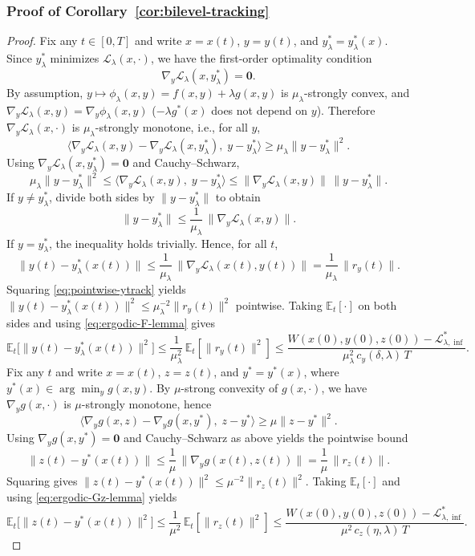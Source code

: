 \documentclass{article}
\newcommand{\1}{\mathbf{1}}
\begin{document}
\subsubsection{Proof of Corollary~\ref{cor:bilevel-tracking}}

\begin{proof}
Fix any $t\in[0,T]$ and write $x=x(t)$, $y=y(t)$, and $y_\lambda^*=y_\lambda^*(x)$.
Since $y_\lambda^*$ minimizes $\mathcal L_\lambda(x,\cdot)$, we have the first-order optimality condition
\[
\nabla_y \mathcal L_\lambda(x,y_\lambda^*)=\mathbf 0.
\]
By assumption, $y\mapsto \phi_\lambda(x,y)=f(x,y)+\lambda g(x,y)$ is $\mu_\lambda$-strongly convex, and
$\nabla_y\mathcal L_\lambda(x,y)=\nabla_y\phi_\lambda(x,y)$ ($-\lambda g^*(x)$ does not depend on $y$).
Therefore $\nabla_y\mathcal L_\lambda(x,\cdot)$ is $\mu_\lambda$-strongly monotone, i.e.,
for all $y$,
\[
\big\langle \nabla_y\mathcal L_\lambda(x,y)-\nabla_y\mathcal L_\lambda(x,y_\lambda^*),\; y-y_\lambda^*\big\rangle
\ge
\mu_\lambda \|y-y_\lambda^*\|^2.
\]
Using $\nabla_y\mathcal L_\lambda(x,y_\lambda^*)=\mathbf 0$ and Cauchy--Schwarz,
\[
\mu_\lambda \|y-y_\lambda^*\|^2
\le
\big\langle \nabla_y\mathcal L_\lambda(x,y),\; y-y_\lambda^*\big\rangle
\le
\|\nabla_y\mathcal L_\lambda(x,y)\|\,\|y-y_\lambda^*\|.
\]
If $y\neq y_\lambda^*$, divide both sides by $\|y-y_\lambda^*\|$ to obtain
\[
\|y-y_\lambda^*\|
\le
\frac{1}{\mu_\lambda}\,\|\nabla_y\mathcal L_\lambda(x,y)\|.
\]
If $y=y_\lambda^*$, the inequality holds trivially. Hence, for all $t$,
\begin{equation}\label{eq:pointwise-ytrack}
\|y(t)-y_\lambda^*(x(t))\|
\le
\frac{1}{\mu_\lambda}\,\|\nabla_y\mathcal L_\lambda(x(t),y(t))\|
=
\frac{1}{\mu_\lambda}\,\|r_y(t)\|.
\end{equation}
Squaring \eqref{eq:pointwise-ytrack} yields
$\|y(t)-y_\lambda^*(x(t))\|^2 \le \mu_\lambda^{-2}\|r_y(t)\|^2$ pointwise.
Taking $\mathbb E_t[\cdot]$ on both sides and using \eqref{eq:ergodic-F-lemma} gives
\[
\mathbb E_t\bigl[\|y(t)-y_\lambda^*(x(t))\|^2\bigr]
\le
\frac{1}{\mu_\lambda^2}\,\mathbb E_t[\|r_y(t)\|^2]
\le
\frac{W(x(0),y(0),z(0))-\mathcal L_{\lambda,\inf}^{*}}{\mu_\lambda^2\,c_y(\delta,\lambda)\,T}.
\]
Fix any $t$ and write $x=x(t)$, $z=z(t)$, and $y^*=y^*(x)$, where $y^*(x)\in\arg\min_y g(x,y)$.
By $\mu$-strong convexity of $g(x,\cdot)$, we have $\nabla_y g(x,\cdot)$ is $\mu$-strongly monotone, hence
\[
\big\langle \nabla_y g(x,z)-\nabla_y g(x,y^*),\; z-y^*\big\rangle
\ge
\mu\|z-y^*\|^2.
\]
Using $\nabla_y g(x,y^*)=\mathbf 0$ and Cauchy--Schwarz as above yields the pointwise bound
\begin{equation}\label{eq:pointwise-ztrack}
\|z(t)-y^*(x(t))\|\le \frac{1}{\mu}\,\|\nabla_y g(x(t),z(t))\|=\frac{1}{\mu}\,\|r_z(t)\|.
\end{equation}
Squaring gives $\|z(t)-y^*(x(t))\|^2\le \mu^{-2}\|r_z(t)\|^2$.
Taking $\mathbb E_t[\cdot]$ and using \eqref{eq:ergodic-Gz-lemma} yields
\[
\mathbb E_t\bigl[\|z(t)-y^*(x(t))\|^2\bigr]
\le
\frac{1}{\mu^2}\,\mathbb E_t[\|r_z(t)\|^2]
\le
\frac{W(x(0),y(0),z(0))-\mathcal L_{\lambda,\inf}^{*}}{\mu^2\,c_z(\eta,\lambda)\,T}.
\]
\end{proof}
\end{document}
